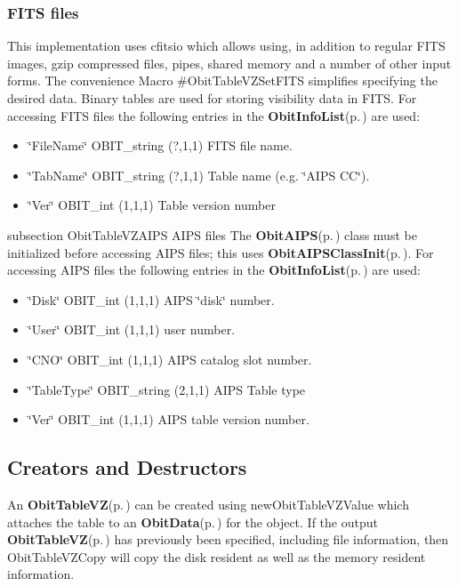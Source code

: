 \subsubsection{FITS files}\label{ObitTableWX_8h_TableFITS}
This implementation uses cfitsio which allows using, in addition to regular FITS images, gzip compressed files, pipes, shared memory and a number of other input forms. The convenience Macro \#Obit\-Table\-VZSet\-FITS simplifies specifying the desired data. Binary tables are used for storing visibility data in FITS. For accessing FITS files the following entries in the {\bf Obit\-Info\-List}{\rm (p.\,\pageref{structObitInfoList})} are used: \begin{itemize}
\item \char`\"{}File\-Name\char`\"{} OBIT\_\-string (?,1,1) FITS file name. \item \char`\"{}Tab\-Name\char`\"{} OBIT\_\-string (?,1,1) Table name (e.g. \char`\"{}AIPS CC\char`\"{}). \item \char`\"{}Ver\char`\"{} OBIT\_\-int (1,1,1) Table version number\end{itemize}
subsection Obit\-Table\-VZAIPS AIPS files The {\bf Obit\-AIPS}{\rm (p.\,\pageref{structObitAIPS})} class must be initialized before accessing AIPS files; this uses {\bf Obit\-AIPSClass\-Init}{\rm (p.\,\pageref{ObitAIPS_8c_a5})}. For accessing AIPS files the following entries in the {\bf Obit\-Info\-List}{\rm (p.\,\pageref{structObitInfoList})} are used: \begin{itemize}
\item \char`\"{}Disk\char`\"{} OBIT\_\-int (1,1,1) AIPS \char`\"{}disk\char`\"{} number. \item \char`\"{}User\char`\"{} OBIT\_\-int (1,1,1) user number. \item \char`\"{}CNO\char`\"{} OBIT\_\-int (1,1,1) AIPS catalog slot number. \item \char`\"{}Table\-Type\char`\"{} OBIT\_\-string (2,1,1) AIPS Table type \item \char`\"{}Ver\char`\"{} OBIT\_\-int (1,1,1) AIPS table version number.\end{itemize}
\subsection{Creators and Destructors}\label{ObitTableVZ_8h_ObitTableVZaccess}
An {\bf Obit\-Table\-VZ}{\rm (p.\,\pageref{structObitTableVZ})} can be created using new\-Obit\-Table\-VZValue which attaches the table to an {\bf Obit\-Data}{\rm (p.\,\pageref{structObitData})} for the object. If the output {\bf Obit\-Table\-VZ}{\rm (p.\,\pageref{structObitTableVZ})} has previously been specified, including file information, then Obit\-Table\-VZCopy will copy the disk resident as well as the memory resident information.

